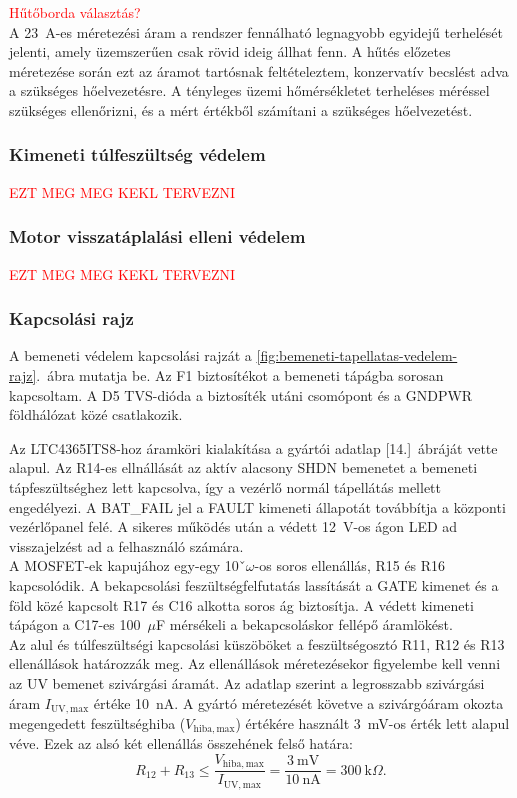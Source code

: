 \textcolor{red}{Hűtőborda választás?} \\

A 23~A-es méretezési áram a rendszer fennálható legnagyobb egyidejű terhelését jelenti, amely
üzemszerűen csak rövid ideig állhat fenn. A hűtés előzetes méretezése során ezt az áramot
tartósnak feltételeztem, konzervatív becslést adva a szükséges hőelvezetésre.
A tényleges üzemi hőmérsékletet terheléses méréssel szükséges ellenőrizni, és
a mért értékből számítani a szükséges hőelvezetést.

\subsubsection{Kimeneti túlfeszültség védelem}
\textcolor{red}{EZT MEG MEG KEKL TERVEZNI}

\subsubsection{Motor visszatáplalási elleni védelem}
\textcolor{red}{EZT MEG MEG KEKL TERVEZNI}

\subsubsection{Kapcsolási rajz}
A bemeneti védelem kapcsolási rajzát a \ref{fig:bemeneti-tapellatas-vedelem-rajz}.~ábra
mutatja be. Az F1 biztosítékot a bemeneti tápágba sorosan kapcsoltam. A D5 TVS-dióda a biztosíték
utáni csomópont és a GNDPWR földhálózat közé csatlakozik.

Az LTC4365ITS8-hoz áramköri kialakítása a gyártói adatlap [14.]~ábráját vette alapul. 
Az R14-es ellnállását az aktív alacsony SHDN bemenetet a bemeneti tápfeszültséghez
lett kapcsolva, így a vezérlő normál tápellátás mellett engedélyezi. A BAT\_FAIL jel a FAULT 
kimeneti állapotát továbbítja a központi vezérlőpanel felé. A sikeres működés után a védett 12~V-os ágon
LED ad visszajelzést ad a felhasználó számára. \\


A MOSFET-ek kapujához egy-egy 10ˇ$\omega$-os soros ellenállás, R15 és R16 kapcsolódik.
A bekapcsolási feszültségfelfutatás lassítását a GATE kimenet és a föld közé kapcsolt R17
és C16 alkotta soros ág biztosítja. A védett kimeneti tápágon a C17-es 100~$\mu$F mérsékeli
a bekapcsoláskor fellépő áramlökést. \\


Az alul és túlfeszültségi kapcsolási küszöböket a feszültségosztó R11, R12 és R13
ellenállások határozzák meg.
Az ellenállások méretezésekor figyelembe kell venni az UV bemenet 
szivárgási áramát. Az adatlap szerint a legrosszabb szivárgási áram $I_{\mathrm{UV,max}}$ értéke 10~nA.
A gyártó méretezését követve a szivárgóáram okozta megengedett feszültséghiba 
($V_{\mathrm{hiba,max}}$) értékére használt 3~mV-os érték lett alapul véve.
Ezek az alsó két ellenállás összehének felső határa:
\begin{equation}
R_{12}+R_{13}
    \leq\dfrac{V_{\mathrm{hiba,max}}}{I_{\mathrm{UV,max}}} =\dfrac{3~\mathrm{mV}}{10~\mathrm{nA}}
    =300~\mathrm{k}\Omega.
    \label{eq:vedelem-oszto-hibakeret}
\end{equation}

